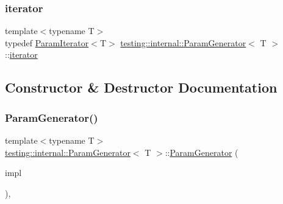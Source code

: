 \subsubsection{\texorpdfstring{iterator}{iterator}\hspace{0.1cm}{\footnotesize\ttfamily [3/3]}}
{\footnotesize\ttfamily template$<$typename T$>$ \\
typedef \mbox{\hyperlink{classtesting_1_1internal_1_1_param_iterator}{Param\+Iterator}}$<$T$>$ \mbox{\hyperlink{classtesting_1_1internal_1_1_param_generator}{testing\+::internal\+::\+Param\+Generator}}$<$ T $>$\+::\mbox{\hyperlink{classtesting_1_1internal_1_1_param_generator_a448b08a8eaae1f1d27840d4dbd66c357}{iterator}}}



\subsection{Constructor \& Destructor Documentation}
\mbox{\label{classtesting_1_1internal_1_1_param_generator_a6b017d4d030927714d495ee95ae92fbc}} 
\subsubsection{\texorpdfstring{ParamGenerator()}{ParamGenerator()}\hspace{0.1cm}{\footnotesize\ttfamily [1/6]}}
{\footnotesize\ttfamily template$<$typename T$>$ \\
\mbox{\hyperlink{classtesting_1_1internal_1_1_param_generator}{testing\+::internal\+::\+Param\+Generator}}$<$ T $>$\+::\mbox{\hyperlink{classtesting_1_1internal_1_1_param_generator}{Param\+Generator}} (\begin{DoxyParamCaption}\item[{\mbox{\hyperlink{classtesting_1_1internal_1_1_param_generator_interface}{Param\+Generator\+Interface}}$<$ T $>$ $\ast$}]{impl }\end{DoxyParamCaption})\hspace{0.3cm}{\ttfamily [inline]}, {\ttfamily [explicit]}}

\mbox{\label{classtesting_1_1internal_1_1_param_generator_a5891d25c31919b3099489f8bbcd58b5e}} 
